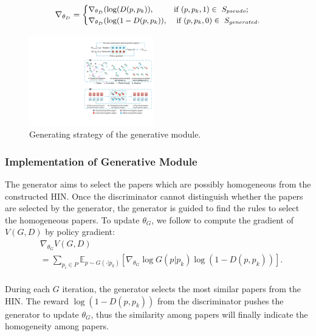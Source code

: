 \documentclass[letterpaper]{article}
\begin{document}
\begin{equation}
\small
\centering
\nabla_{\theta_D} = \begin{cases} \nabla_{\theta_D}(\log(D(p, p_k)), & \mbox{if } (p, p_k, 1) \in \mbox{ $S_{pseudo}$}; \\
\nabla_{\theta_D}(\log(1-D(p, p_k)), & \mbox{ if }  (p, p_k, 0) \in\mbox{ $S_{generated}$}.\\
\end{cases}
\label{eq:Dgradient}
\end{equation}

\begin{figure}[t]
\centering
\includegraphics[width=0.48\textwidth]{G.pdf}
\caption{Generating strategy of the generative module.}
\label{fig:G_framework}
\end{figure}

\subsubsection{Implementation of Generative Module}
The generator aims to select the papers which are possibly homogeneous from the constructed HIN.
Once the discriminator cannot distinguish whether the papers are selected by the generator, the generator is guided to find the rules to select the homogeneous papers.
To update $\theta_G$, we follow \cite{policy1} to compute the gradient of $V(G, D)$ by policy gradient:
\begin{equation}
\begin{split}
&\nabla_{\theta_G} V(G, D) \\
& =  \sum_{p_i \in P}\mathbb{E}_{p \sim G(\cdot|p_k)}[\nabla_{\theta_G}\log G(p|p_k) \log (1-D(p, p_k))].\\
\end{split}
\label{eq:Ggradient}
\end{equation}

During each $G$ iteration, the generator selects the most similar papers from the HIN.
The reward $\log (1-D(p, p_k))$ from the discriminator pushes the generator to update $\theta_G$, thus the similarity among papers will finally indicate the homogeneity among papers.
\end{document}
